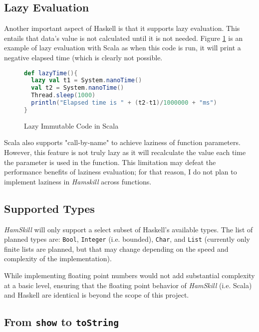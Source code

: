 \documentclass{report}
\begin{document}
\subsection{Lazy Evaluation}\label{sec:lazyEvaluationScala}

Another important aspect of Haskell is that it supports lazy evaluation.  This entails that data's value is not calculated until it is not needed.  Figure \ref{fig:lazyImmutabilityInScala} is an example of lazy evaluation with Scala as when this code is run, it will print a negative elapsed time (which is clearly not possible.

\begin{figure}[H]\label{fig:lazyImmutabilityInScala}
\begin{mdframed}
\begin{lstlisting}[language=Scala]
def lazyTime(){
  lazy val t1 = System.nanoTime()
  val t2 = System.nanoTime()
  Thread.sleep(1000)
  println("Elapsed time is " + (t2-t1)/1000000 + "ms")
}
\end{lstlisting}
\end{mdframed}
\caption{Lazy Immutable Code in Scala}
\end{figure}

Scala also supports "call-by-name" to achieve laziness of function parameters.  However, this feature is not truly lazy as it will recalculate the value each time the parameter is used in the function.  This limitation may defeat the performance benefits of laziness evaluation; for that reason, I do not plan to implement laziness in \emph{Hamskill} across functions.

\subsection{Supported Types}

\emph{HamSkill} will only support a select subset of Haskell's available types.  The list of planned types are: {\tt Bool}, {\tt Integer} (i.e. bounded), {\tt Char}, and {\tt List} (currently only finite lists are planned, but that may change depending on the speed and complexity of the implementation).

While implementing floating point numbers would not add substantial complexity at a basic level, ensuring that the floating point behavior of \emph{HamSkill} (i.e. Scala) and Haskell are identical is beyond the scope of this project.

\subsection{From {\tt show} to {\tt toString}}
\end{document}
